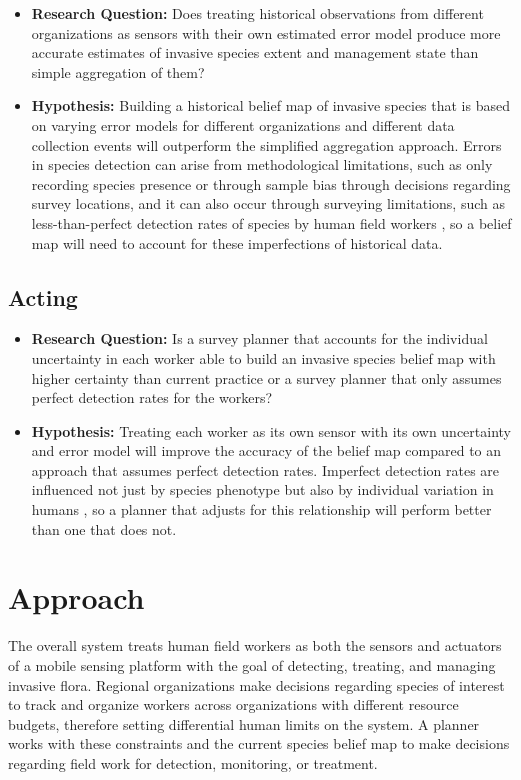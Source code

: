 \documentclass{article}
\begin{document}
    \begin{itemize}
        \item \textbf{Research Question:} Does treating historical observations from different organizations as sensors with their own estimated error model produce more accurate estimates of invasive species extent and management state than simple aggregation of them?

        \item \textbf{Hypothesis:} Building a historical belief map of invasive species that is based on varying error models for different organizations and different data collection events will outperform the simplified aggregation approach. Errors in species detection can arise from methodological limitations, such as only recording species presence or through sample bias through decisions regarding survey locations, and it can also occur through surveying limitations, such as less-than-perfect detection rates of species by human field workers \cite{practical-guide-for-combining-data}, so a belief map will need to account for these imperfections of historical data.

    \end{itemize}


\subsection{Acting}

    \begin{itemize}
        \item \textbf{Research Question:} Is a survey planner that accounts for the individual uncertainty in each worker able to build an invasive species belief map with higher certainty than current practice or a survey planner that only assumes perfect detection rates for the workers?

        \item \textbf{Hypothesis:} Treating each worker as its own sensor with its own uncertainty and error model will improve the accuracy of the belief map compared to an approach that assumes perfect detection rates. Imperfect detection rates are influenced not just by species phenotype but also by individual variation in humans \cite{detectability-global-weed}, so a planner that adjusts for this relationship will perform better than one that does not.
    \end{itemize}


\section{Approach}
The overall system treats human field workers as both the sensors and actuators of a mobile sensing platform with the goal of detecting, treating, and managing invasive flora. Regional organizations make decisions regarding species of interest to track and organize workers across organizations with different resource budgets, therefore setting differential human limits on the system. A planner works with these constraints and the current species belief map to make decisions regarding field work for detection, monitoring, or treatment.
\end{document}
